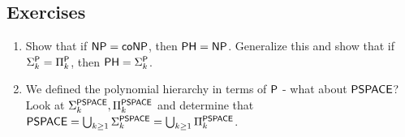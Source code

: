 \subsection{Exercises}
\begin{enumerate}

\item Show that if $\NP = \coNP$, then $\PH = \NP$. Generalize this and show that if $\Sigma_k^\P = \Pi_k^\P$, then $\PH = \Sigma_k^\P$.

\item We defined the polynomial hierarchy in terms of $\P$ - what about $\PSPACE$? Look at $\Sigma_k^\PSPACE, \Pi_k^\PSPACE$ and determine that $\PSPACE = \bigcup_{k \ge 1} \Sigma_k^\PSPACE = \bigcup_{k \ge 1} \Pi_k^\PSPACE$.
\end{enumerate}